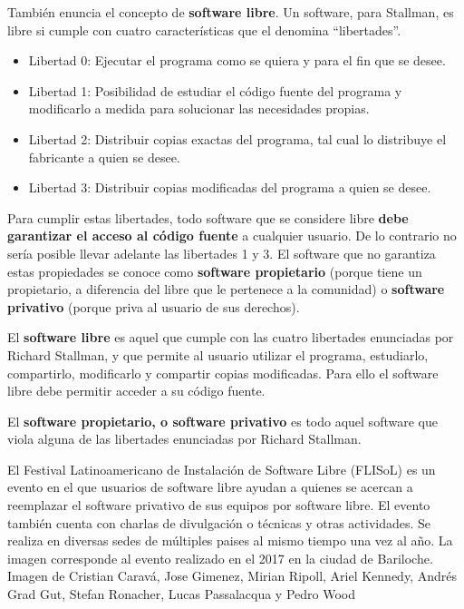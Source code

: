 También enuncia el concepto de \textbf{software libre}. Un software, para
Stallman, es libre si cumple con cuatro características que el denomina ``libertades''.
\begin{itemize}
    \item Libertad 0: Ejecutar el programa como se quiera y para el fin que se desee.
    \item Libertad 1: Posibilidad de estudiar el código fuente del programa y modificarlo a medida para solucionar las necesidades propias.
    \item Libertad 2: Distribuir copias exactas del programa, tal cual lo distribuye el fabricante a quien se desee.
    \item Libertad 3: Distribuir copias modificadas del programa a quien se desee.
\end{itemize}

Para cumplir estas libertades, todo software que se considere libre \textbf{debe
garantizar el acceso al código fuente} a cualquier usuario. De lo contrario no
sería posible llevar adelante las libertades 1 y 3. El software que no garantiza
estas propiedades se conoce como \textbf{software propietario} (porque tiene
un propietario, a diferencia del libre que le pertenece a la comunidad) o
\textbf{software privativo} (porque priva al usuario de sus derechos).\autocite{stallman_2009}

\begin{definition}
    El \textbf{software libre} es aquel que cumple con las cuatro libertades
    enunciadas por Richard Stallman, y que permite al usuario utilizar el programa,
    estudiarlo, compartirlo, modificarlo y compartir copias modificadas. Para ello
    el software libre debe permitir acceder a su código fuente.
\end{definition}

\begin{definition}
    El \textbf{software propietario, o software privativo} es todo aquel
    software que viola alguna de las libertades enunciadas por Richard Stallman.
\end{definition}

{El Festival Latinoamericano de Instalación de Software Libre (FLISoL) es un
evento en el que usuarios de software libre ayudan a quienes se acercan a
reemplazar el software privativo de sus equipos por software libre. El evento
también cuenta con charlas de divulgación o técnicas y otras actividades. Se
realiza en diversas sedes de múltiples paises al mismo tiempo una vez al año.
La imagen corresponde al evento realizado en el 2017 en la ciudad de Bariloche.}
{Imagen de Cristian Caravá, Jose Gimenez, Mirian Ripoll, Ariel Kennedy, Andrés
Grad Gut, Stefan Ronacher, Lucas Passalacqua y Pedro Wood}

